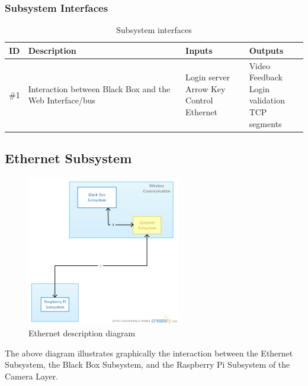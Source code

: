 \subsubsection{Subsystem Interfaces}

\begin {table}[H]
\caption {Subsystem interfaces} 
\begin{center}
    \begin{tabular}{ | p{1cm} | p{6cm} | p{3cm} | p{3cm} |}
    \hline
    ID & Description & Inputs & Outputs \\ \hline
    \#1 & Interaction between Black Box and the Web Interface/bus & \pbox{3cm}{Login server \\ Arrow Key Control \\ Ethernet} & \pbox{3cm}{Video Feedback \\ Login validation \\ TCP segments}  \\ \hline
    \end{tabular}
\end{center}
\end{table}

\subsection{Ethernet Subsystem}

\begin{figure}[h!]
	\centering
 	\includegraphics[width=0.60\textwidth]{images/ADS diagrams/ethernet_subsystem}
 \caption{Ethernet description diagram}
\end{figure}

The above diagram illustrates graphically the interaction between the Ethernet Subsystem, the Black Box Subsystem, and the Raspberry Pi Subsystem of the Camera Layer. 

